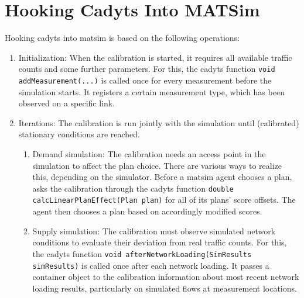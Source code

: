 \section{Hooking Cadyts Into MATSim}
Hooking \gls{cadyts} into \gls{matsim} is based on the following operations:
\begin{enumerate}\styleEnumerate
\item Initialization: When the calibration is started, it requires all available 
traffic counts and some further parameters. 
For this, the \gls{cadyts} function \lstinline|void addMeasurement(...)| is called once for every 
measurement\corr{,}{} before the simulation starts. It registers a certain
measurement type, which has been observed on a specific link.
\item Iterations: The calibration is run jointly with the simulation until (calibrated) 
stationary conditions are reached.
	\begin{enumerate}[label=\emph{\alph*})]
	\item Demand simulation: The calibration needs an access point in the simulation 
	to affect the plan choice. There are various ways to realize this, depending on the  
	simulator.	
	Before a \gls{matsim} agent chooses a plan,  asks the
	calibration through the \gls{cadyts} function
	\lstinline|double calcLinearPlanEffect(Plan plan)| for all of its plans' score offsets.
    The agent then chooses a plan based on accordingly modified scores.
	\item Supply simulation: The calibration must observe simulated network conditions 
  to evaluate their deviation from real traffic counts.
	For this, the \gls{cadyts} function \lstinline|void afterNetworkLoading(SimResults simResults)| 
	is called once after each network loading. It passes a container object to the calibration
	 information about  most recent
	network loading results, particularly on simulated flows at measurement locations.
	\end{enumerate}
\end{enumerate}

